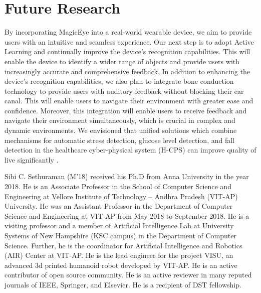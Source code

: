 \documentclass[journal,12pt,onecolumn,letterpaper]{IEEEtran}
\begin{document}
\section{Future Research}
\label{Sec:Future_Research}

By incorporating MagicEye into a real-world wearable device, we aim to provide users with an intuitive and seamless experience. Our next step is to adopt Active Learning and continually improve the device's recognition capabilities. This will enable the device to identify a wider range of objects and provide users with increasingly accurate and comprehensive feedback. In addition to enhancing the device's recognition capabilities, we also plan to integrate bone conduction technology to provide users with auditory feedback without blocking their ear canal. This will enable users to navigate their environment with greater ease and confidence. Moreover, this integration will enable users to receive feedback and navigate their environment simultaneously, which is crucial in complex and dynamic environments. We envisioned that unified solutions which combine mechanisms for automatic stress detection, glucose level detection, and fall detection in the healthcare cyber-physical system (H-CPS) can improve quality of live significantly \cite{Rachakonda_TCE_2021, Rachakonda_IFIP-IoT_2021, Joshi_TCE_2020, Sayeed_TCE_2019}.







\begin{IEEEbiography}
{Sibi C. Sethuraman} (M'18) received his Ph.D from Anna University in the year 2018. He is an Associate Professor in the School of Computer Science and Engineering at Vellore Institute of Technology – Andhra Pradesh (VIT-AP) University. 
He was an Assistant Professor in the Department of Computer Science and Engineering at VIT-AP from May 2018 to September 2018. 
He is a visiting professor and a member of Artificial Intelligence Lab at University Systems of New Hampshire (KSC campus) in the Department of Computer Science. 
Further, he is the coordinator for Artificial Intelligence and Robotics (AIR) Center at VIT-AP. 
He is the lead engineer for the project VISU, an advanced 3d printed humanoid robot developed by VIT-AP. 
He is an active contributor of open source community. 
He is an active reviewer in many reputed journals of IEEE, Springer, and Elsevier. He is a recipient of DST fellowship.
\end{IEEEbiography}
\end{document}
